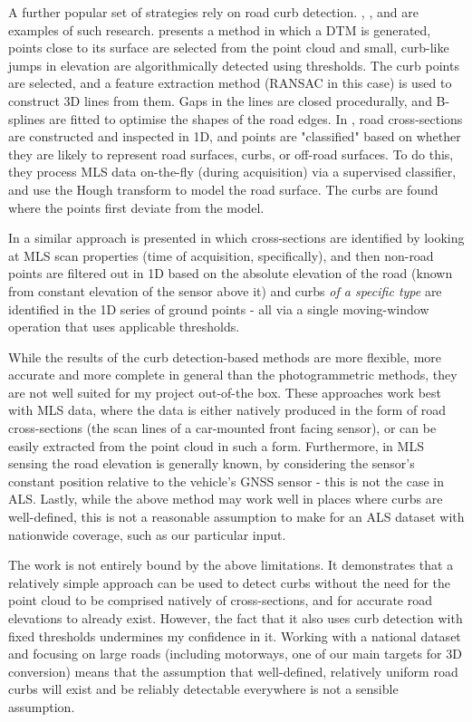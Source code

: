 A further popular set of strategies rely on road curb detection. \cite{vosselman_zhou_2009}, \cite{zhang_2010}, and \cite{yang_etal_2013} are examples of such research. \cite{vosselman_zhou_2009} presents a method in which a DTM is generated, points close to its surface are selected from the point cloud and small, curb-like jumps in elevation are algorithmically detected using thresholds. The curb points are selected, and a feature extraction method (RANSAC in this case) is used to construct 3D lines from them. Gaps in the lines are closed procedurally, and B-splines are fitted to optimise the shapes of the road edges. In \cite{zhang_2010}, road cross-sections are constructed and inspected in 1D, and points are "classified" based on whether they are likely to represent road surfaces, curbs, or off-road surfaces. To do this, they process MLS data on-the-fly (during acquisition) via a supervised classifier, and use the Hough transform to model the road surface. The curbs are found where the points first deviate from the model.

In \cite{yang_etal_2013} a similar approach is presented in which cross-sections are identified by looking at MLS scan properties (time of acquisition, specifically), and then non-road points are filtered out in 1D based on the absolute elevation of the road (known from constant elevation of the sensor above it) and curbs \textit{of a specific type} are identified in the 1D series of ground points - all via a single moving-window operation that uses applicable thresholds.

While the results of the curb detection-based methods are more flexible, more accurate and more complete in general than the photogrammetric methods, they are not well suited for my project out-of-the box. These approaches work best with MLS data, where the data is either natively produced in the form of road cross-sections (the scan lines of a car-mounted front facing sensor), or can be easily extracted from the point cloud in such a form. Furthermore, in MLS sensing the road elevation is generally known, by considering the sensor's constant position relative to the vehicle's GNSS sensor - this is not the case in ALS. Lastly, while the above method may work well in places where curbs are well-defined, this is not a reasonable assumption to make for an ALS dataset with nationwide coverage, such as our particular input.

The work \cite{vosselman_zhou_2009} is not entirely bound by the above limitations. It demonstrates that a relatively simple approach can be used to detect curbs without the need for the point cloud to be comprised natively of cross-sections, and for accurate road elevations to already exist. However, the fact that it also uses curb detection with fixed thresholds undermines my confidence in it. Working with a national dataset and focusing on large roads (including motorways, one of our main targets for 3D conversion) means that the assumption that well-defined, relatively uniform road curbs will exist and be reliably detectable everywhere is not a sensible assumption.

